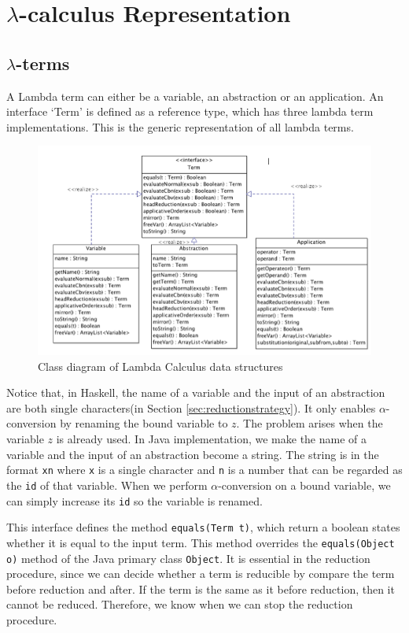 \section{$\lambda$-calculus Representation}
\subsection{$\lambda$-terms}
A Lambda term can either be a variable, an abstraction or an application. An interface `Term' is defined as a reference type, which has three lambda term implementations. This is the generic representation of all lambda terms.

\begin{figure}[ht]
\centering
\includegraphics[scale=0.8]{pics/Term2}
\caption{Class diagram of Lambda Calculus data structures}
\label{fig:term1}
\end{figure}

Notice that, in Haskell, the name of a variable and the input of an abstraction are both single characters(in Section \ref{sec:reductionstrategy}). It only enables $\alpha$-conversion by renaming the bound variable to $z$. The problem arises when the variable $z$ is already used. In Java implementation, we make the name of a variable and the input of an abstraction become a string. The string is in the format \texttt{xn} where \texttt{x} is a single character and \texttt{n} is a number that can be regarded as the \texttt{id} of that variable. When we perform $\alpha$-conversion on a bound variable, we can simply increase its \texttt{id} so the variable is renamed.  

This interface defines the method \verb|equals(Term t)|, which return a boolean states whether it is equal to the input term. This method overrides the \verb|equals(Object o)| method of the Java primary class \verb|Object|. It is essential in the reduction procedure, since we can decide whether a term is reducible by compare the term before reduction and after. If the term is the same as it before reduction, then it cannot be reduced. Therefore, we know when we can stop the reduction procedure.  


